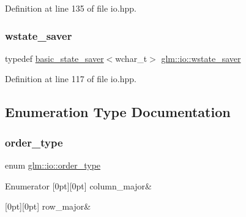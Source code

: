 Definition at line 135 of file io.\+hpp.

\mbox{\label{namespaceglm_1_1io_a7a46501fc459c05fa3dc0f2bcbf3e92f}} 
\subsubsection{\texorpdfstring{wstate\+\_\+saver}{wstate\_saver}}
{\footnotesize\ttfamily typedef \hyperlink{classglm_1_1io_1_1basic__state__saver}{basic\+\_\+state\+\_\+saver}$<$wchar\+\_\+t$>$ \hyperlink{namespaceglm_1_1io_a7a46501fc459c05fa3dc0f2bcbf3e92f}{glm\+::io\+::wstate\+\_\+saver}}



Definition at line 117 of file io.\+hpp.



\subsection{Enumeration Type Documentation}
\mbox{\label{namespaceglm_1_1io_a3497781803fe594a37177e05ab2a795f}} 
\subsubsection{\texorpdfstring{order\+\_\+type}{order\_type}}
{\footnotesize\ttfamily enum \hyperlink{namespaceglm_1_1io_a3497781803fe594a37177e05ab2a795f}{glm\+::io\+::order\+\_\+type}}

\begin{DoxyEnumFields}{Enumerator}
[0pt][0pt]{}\mbox{\label{namespaceglm_1_1io_a3497781803fe594a37177e05ab2a795faab661780f7f081ee11c34be9b0742229}} 
column\+\_\+major&\\
\hline

[0pt][0pt]{}\mbox{\label{namespaceglm_1_1io_a3497781803fe594a37177e05ab2a795fad080bb2f932ea4078fd0fc10ea1c991c}} 
row\+\_\+major&\\
\hline

\end{DoxyEnumFields}


